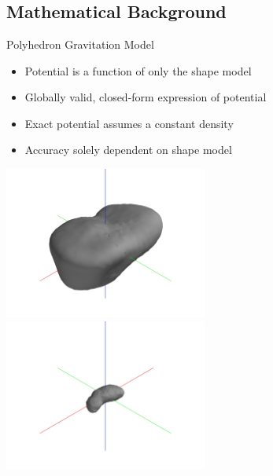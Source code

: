 \documentclass[11pt,professionalfonts,aspectratio=169]{beamer}
\begin{document}
\section*{}
\subsection*{Mathematical Background}
\begin{frame}{Polyhedron Gravitation Model}

\begin{itemize}
    \item Potential is a function of only the shape model
    \item Globally valid, closed-form expression of potential
    \item Exact potential assumes a constant density 
    \item Accuracy solely dependent on shape model
\end{itemize}
\vspace*{-0.6cm}
\begin{center}
    \includegraphics[width=0.5\textwidth,keepaspectratio]{figures/castalia/partial_2047.jpg}~
    \includegraphics[width=0.5\textwidth,keepaspectratio]{figures/itokawa/partial_25349.jpg}
\end{center}
\end{frame}
\end{document}
